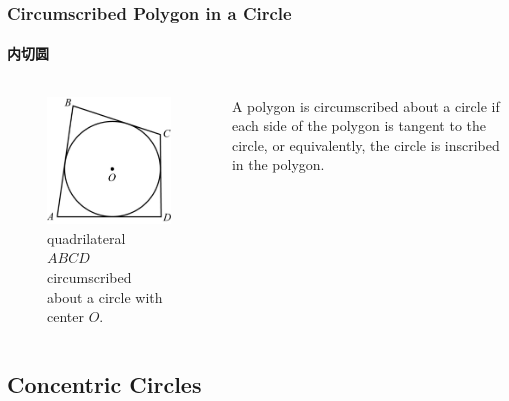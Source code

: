 \documentclass[
	11pt, %
]{beamer}
\begin{document}
\begin{frame}
\frametitle{Circumscribed Polygon in a Circle}
\framesubtitle{内切圆}

\begin{columns}[t] 
		\begin{column}{0.4\textwidth} %
			\begin{figure}
				\includegraphics[width=\linewidth]{Circumscribed.jpg}
				\caption{quadrilateral $ABCD$ circumscribed about a circle with center $O$.}
			\end{figure}
		\end{column}
		\begin{column}{0.6\textwidth} %
		\begin{definition}
			A polygon is circumscribed about a circle if each side of the polygon is tangent to the circle, or equivalently, the circle is inscribed in the polygon.
		\end{definition}
		\end{column}
	\end{columns}
\end{frame}


\subsection{Concentric Circles}
\end{document}
